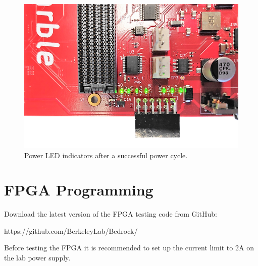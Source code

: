 \documentclass[12pt,oneside,a4]{article}
\begin{document}
\begin{figure}[H]
\begin{center}
\includegraphics[width=0.7\linewidth]{leds.png}
 \caption{Power LED indicators after a successful power cycle.}\label{leds}
\end{center}
\end{figure}

\section{FPGA Programming}
Download the latest version of the FPGA testing code from GitHub:
\begin{leftbar}
https://github.com/BerkeleyLab/Bedrock/
\end{leftbar}

\begin{leftbar}
Before testing the FPGA it is recommended to set up the current limit to 2A on the lab power supply.
\end{leftbar}
\end{document}
